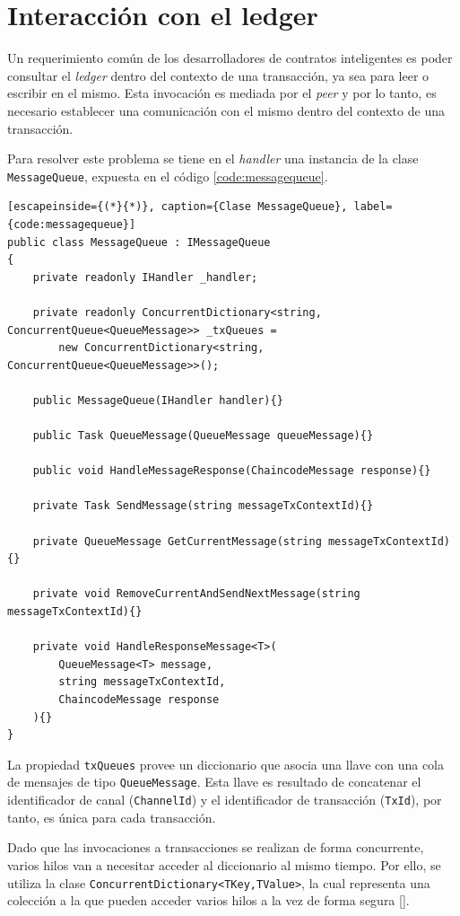 \section{Interacción con el ledger}\label{ledgerinteraction}
Un requerimiento común de los desarrolladores de contratos inteligentes es poder consultar el \textit{ledger} dentro del contexto de una transacción, ya sea para leer o escribir en el mismo. Esta invocación es mediada por el \textit{peer} y por lo tanto, es necesario establecer una comunicación con el mismo dentro del contexto de una transacción.

Para resolver este problema se tiene en el \textit{handler} una instancia de la clase \texttt{MessageQueue}, expuesta en el código \ref{code:messagequeue}.\\

\begin{lstlisting}[escapeinside={(*}{*)}, caption={Clase MessageQueue}, label={code:messagequeue}]
public class MessageQueue : IMessageQueue
{
    private readonly IHandler _handler;

    private readonly ConcurrentDictionary<string, ConcurrentQueue<QueueMessage>> _txQueues =
        new ConcurrentDictionary<string, ConcurrentQueue<QueueMessage>>();

    public MessageQueue(IHandler handler){}

    public Task QueueMessage(QueueMessage queueMessage){}

    public void HandleMessageResponse(ChaincodeMessage response){}

    private Task SendMessage(string messageTxContextId){}

    private QueueMessage GetCurrentMessage(string messageTxContextId){}

    private void RemoveCurrentAndSendNextMessage(string messageTxContextId){}

    private void HandleResponseMessage<T>(
        QueueMessage<T> message,
        string messageTxContextId,
        ChaincodeMessage response
    ){}
}
\end{lstlisting}
La propiedad \texttt{txQueues} provee un diccionario que asocia una llave con una cola de mensajes de tipo \texttt{QueueMessage}. Esta llave es resultado de concatenar el identificador de canal (\texttt{ChannelId}) y el identificador de transacción (\texttt{TxId}), por tanto, es única para cada transacción.

Dado que las invocaciones a transacciones se realizan de forma concurrente, varios hilos van a necesitar acceder al diccionario al mismo tiempo. Por ello, se utiliza la clase \texttt{ConcurrentDictionary<TKey,TValue>}, la cual representa una colección a la que pueden acceder varios hilos a la vez de forma segura [\cite{microsoftdoc}].

